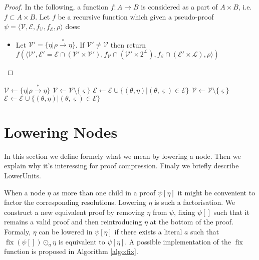 \documentclass{llncs}
\newcommand{\fix}{\ensuremath{\operatorname{fix}}}
\newenvironment{jogo}{\color{teal}}{}
\begin{document}
\begin{proof}
In the following, a function $f : A \longrightarrow B$ is considered as a part of $A \times B$, i.e.
$f \subset A \times B$.
Let $f$ be a recursive function which given a pseudo-proof $\psi = \langle \mathcal{V},
\mathcal{E}, f_\mathcal{V}, f_\mathcal{E}, \rho \rangle$ does:
\begin{itemize}%
  \item Let $\mathcal{V}' = \{\eta|\rho \xrightarrow{*} \eta\}$. If $\mathcal{V}' \neq \mathcal{V}$
    then return $f\left(\langle \mathcal{V}', \mathcal{E}' = \mathcal{E} \cap (\mathcal{V}' \times \mathcal{V}'),
    f_\mathcal{V} \cap (\mathcal{V}' \times 2^\mathcal{L}), f_\mathcal{E} \cap (\mathcal{E}' \times \mathcal{L}),
    \rho \rangle\right)$
\end{itemize}
\end{proof}

\begin{algorithm}[hbt]
    { $\mathcal{V} \leftarrow \{\eta|\rho \xrightarrow{*} \eta\}$ \;
    }
  \uElseIf{$\exists \varsigma, \exists ! \eta, \varsigma \rightarrow \eta$}
    { $\mathcal{V} \leftarrow \mathcal{V} \setminus \{\varsigma\}$ \;
      $\mathcal{E} \leftarrow \mathcal{E} \cup \{(\theta,\eta)|(\theta,\varsigma) \in \mathcal{E}\}$ \;
    }
    { $\mathcal{V} \leftarrow \mathcal{V} \setminus \{\varsigma\}$ \;
      $\mathcal{E} \leftarrow \mathcal{E} \cup \{(\theta,\eta)|(\theta,\varsigma) \in \mathcal{E}\}$ \;
    }
\end{algorithm}

\section{Lowering Nodes}

\begin{jogo}
In this section we define formely what we mean by lowering a node. Then we explain why it's
interessing for proof compression. Finaly we briefly describe LowerUnits.
\end{jogo}

When a node $\eta$ as more than one child in a proof $\psi[\eta]$ it might be convenient to factor
the corresponding resolutions. Lowering $\eta$ is such a factorisation. We construct a new
equivalent proof by removing $\eta$ from $\psi$, fixing $\psi[]$ such that it remains a valid proof
and then reintroducing $\eta$ at the bottom of the proof. Formaly, $\eta$ can be lowered in
$\psi[\eta]$ if there exists a literal $a$ such that $\fix\left(\psi[]\right) \odot_a
\eta$ is equivalent to $\psi[\eta]$. A possible implementation of the $\fix$ function
is proposed in Algorithm \ref{algo:fix}.
\end{document}
